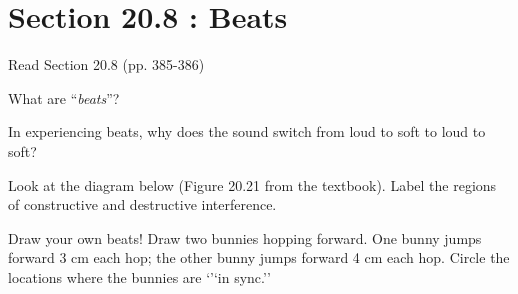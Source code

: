 \documentclass[10pt]{exam}
\begin{document}
\pagebreak
 
\section{Section 20.8 : Beats}

Read Section 20.8 (pp. 385-386)

\begin{questions}
  \question
    What are ``\emph{beats}''? \vs

  \question
    In experiencing beats, why does the sound switch from loud to soft to loud to soft? \vs

  \question
    Look at the diagram below (Figure 20.21 from the textbook).  Label the regions of constructive and destructive interference.

 
  \question
    Draw your own beats!  Draw two bunnies hopping forward.  One bunny jumps forward 3 cm each hop; the other bunny jumps forward 4 cm each hop.  Circle the locations where the bunnies are `'`in sync.''

\end{questions}

\vs[2]
\end{document}

